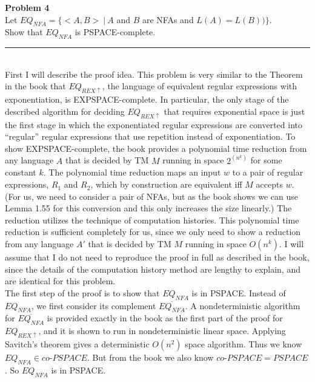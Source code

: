 \documentclass[paper=a4, fontsize=11pt]{scrartcl} %
\numberwithin{equation}{section} %
\numberwithin{figure}{section} %
\numberwithin{table}{section} %
\newcommand{\horrule}[1]{\rule{\linewidth}{#1}} %
\begin{document}
\newpage

\textbf{Problem 4}
\\

Let $EQ_{NFA}  = \{<A,B> \ | \ A$ and $B$ are NFAs and $L(A) = L(B)) \}$.\\

Show that $EQ_{NFA}$ is PSPACE-complete.

\horrule{1pt} 
\\

First I will describe the proof idea.  This problem is very similar to the Theorem in the book that $EQ_{REX\uparrow}$, the language of equivalent regular expressions with exponentiation, is EXPSPACE-complete.  In particular, the only stage of the described algorithm for deciding $EQ_{REX\uparrow}$ that requires exponential space is just the first stage in which the exponentiated regular expressions are converted into ``regular'' regular expressions that use repetition instead of exponentiation.  To show EXPSPACE-complete, the book provides a polynomial time reduction from any language $A$ that is decided by TM $M$ running in space $2^{(n^k)}$ for some constant $k$.  The polynomial time reduction maps an input $w$ to a pair of regular expressions, $R_1$ and $R_2$, which by construction are equivalent iff $M$ accepts $w$.  (For us, we need to consider a pair of NFAs, but as the book shows we can use Lemma 1.55 for this conversion and this only increases the size linearly.)  The reduction utilizes the technique of computation histories.  This polynomial time reduction is sufficient completely for us, since we only need to show a reduction from any language $A'$ that is decided by TM $M$ running in space $O(n^k)$.  I will assume that I do not need to reproduce the proof in full as described in the book, since the details of the computation history method are lengthy to explain, and are identical for this problem.\\

The first step of the proof is to show that $EQ_{NFA}$ is in PSPACE.  Instead of $EQ_{NFA}$, we first consider its complement $\overline{EQ_{NFA}}$.  A nondeterministic algorithm for $\overline{EQ_{NFA}}$ is provided exactly in the book as the first part of the proof for $EQ_{REX\uparrow}$, and it is shown to run in nondeterministic linear space.  Applying Savitch's theorem gives a deterministic $O(n^2)$ space algorithm.  Thus we know $EQ_{NFA} \in co$-$PSPACE$.  But from the book we also know $co$-$PSPACE = PSPACE$.  So $EQ_{NFA}$ is in PSPACE.\\
\end{document}
